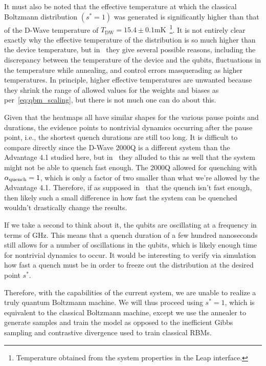 It must also be noted that the effective temperature at which the classical Boltzmann distribution \( (s^* = 1) \) was generated is significantly higher than that of the D-Wave temperature of \( T_\text{DW} = 15.4 \pm 0.1 \si{\milli\kelvin} \)~\cite{dwave_leap}\footnote{Temperature obtained from the system properties in the Leap interface.}.
It is not entirely clear exactly why the effective temperature of the distribution is so much higher than the device temperature, but in~\cite{marshall_2019} they give several possible reasons, including the discrepancy between the temperature of the device and the qubits, fluctuations in the temperature while annealing, and control errors masquerading as higher temperatures.
In principle, higher effective temperatures are unwanted because they shrink the range of allowed values for the weights and biases as per~\cref{eq:qbm_scaling}, but there is not much one can do about this.

Given that the heatmaps all have similar shapes for the various pause points and durations, the evidence points to nontrivial dynamics occurring after the pause point, i.e., the shortest quench durations are still too long.
It is difficult to compare directly since the D-Wave 2000Q is a different system than the Advantage 4.1 studied here, but in~\cite{marshall_2019} they alluded to this as well that the system might not be able to quench fast enough.
The 2000Q allowed for quenching with \( \alpha_{\text{quench}} = 1 \), which is only a factor of two smaller than what we're allowed by the Advantage 4.1.
Therefore, if as supposed in~\cite{marshall_2019} that the quench isn't fast enough, then likely such a small difference in how fast the system can be quenched wouldn't drastically change the results.

If we take a second to think about it, the qubits are oscillating at a frequency in terms of GHz.
This means that a quench duration of a few hundred nanoseconds still allows for a number of oscillations in the qubits, which is likely enough time for nontrivial dynamics to occur.
It would be interesting to verify via simulation how fast a quench must be in order to freeze out the distribution at the desired point \( s^* \).

Therefore, with the capabilities of the current system, we are unable to realize a truly quantum Boltzmann machine.
We will thus proceed using \( s^* = 1 \), which is equivalent to the classical Boltzmann machine, except we use the annealer to generate samples and train the model as opposed to the inefficient Gibbs sampling and contrastive divergence used to train classical RBMs.

